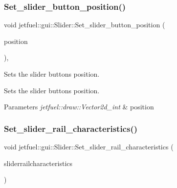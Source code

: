 \subsubsection{\texorpdfstring{Set\+\_\+slider\+\_\+button\+\_\+position()}{Set\_slider\_button\_position()}}
{\footnotesize\ttfamily void jetfuel\+::gui\+::\+Slider\+::\+Set\+\_\+slider\+\_\+button\+\_\+position (\begin{DoxyParamCaption}\item[{\hyperlink{classjetfuel_1_1draw_1_1Vector2d}{jetfuel\+::draw\+::\+Vector2d\+\_\+int}}]{position }\end{DoxyParamCaption})\hspace{0.3cm}{\ttfamily [inline]}, {\ttfamily [protected]}}



Sets the slider button\textquotesingle{}s position. 

Sets the slider button\textquotesingle{}s position.


\begin{DoxyParams}{Parameters}
{\em jetfuel\+::draw\+::\+Vector2d\+\_\+int} & position \\
\hline
\end{DoxyParams}
\mbox{\label{classjetfuel_1_1gui_1_1Slider_a2cd13b87b896c03771bcdc29df1e1fc6}} 
\subsubsection{\texorpdfstring{Set\+\_\+slider\+\_\+rail\+\_\+characteristics()}{Set\_slider\_rail\_characteristics()}}
{\footnotesize\ttfamily void jetfuel\+::gui\+::\+Slider\+::\+Set\+\_\+slider\+\_\+rail\+\_\+characteristics (\begin{DoxyParamCaption}\item[{\hyperlink{structjetfuel_1_1draw_1_1Rectangle__2d__shape_1_1Rectangle__2d__shape__characteristics}{jetfuel\+::draw\+::\+Rectangle\+\_\+2d\+\_\+shape\+::\+Rectangle\+\_\+2d\+\_\+shape\+\_\+characteristics}}]{sliderrailcharacteristics }\end{DoxyParamCaption})\hspace{0.3cm}{\ttfamily [inline]}}



